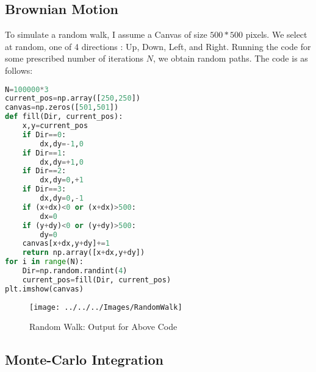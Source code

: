\subsection{Brownian Motion}
To simulate a random walk, I assume a Canvas of size $500*500$ pixels. We select at random, one of 4 directions : Up, Down, Left, and Right. Running the code for some prescribed number of iterations $N$, we obtain random paths. The code is as follows:
\begin{lstlisting}[language=Python, caption=Random Walk, frame=single, label={lst:randomwalk} ]
N=100000*3
current_pos=np.array([250,250])
canvas=np.zeros([501,501])
def fill(Dir, current_pos):
	x,y=current_pos
	if Dir==0:
		dx,dy=-1,0
	if Dir==1:
		dx,dy=+1,0
	if Dir==2:
		dx,dy=0,+1
	if Dir==3:
		dx,dy=0,-1
	if (x+dx)<0 or (x+dx)>500:
		dx=0
	if (y+dy)<0 or (y+dy)>500:
		dy=0
	canvas[x+dx,y+dy]+=1
	return np.array([x+dx,y+dy])
for i in range(N):
	Dir=np.random.randint(4)
	current_pos=fill(Dir, current_pos)
plt.imshow(canvas)

\end{lstlisting}
\begin{figure}[H]
	\centering
	\texttt{[image: ../../../Images/RandomWalk]}
	\caption[Random Walk]{Random Walk: Output for Above Code}
	\label{fig:randomwalk}
\end{figure}
\subsection{Monte-Carlo Integration}




